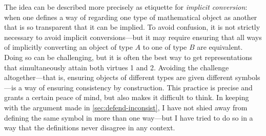 The idea can be described more precisely as etiquette for \emph{implicit conversion}: when one defines a way of regarding one type of mathematical object as another that is so transparent that it can be implied. 
%
To avoid confusion, it is not strictly necessary to avoid implicit conversions---but it may require ensuring that all ways of implicitly converting an object of type $A$ to one of type $B$ are equivalent. 
%
Doing so can be challenging, but it is often the best way to get representations that simultaneously attain both virtues 1 and 2. 
%
%
Avoiding the challenge altogether---that is, ensuring objects of different types are given different symbols---is 
    a way of ensuring consistency by construction. 
This practice is precise and grants a certain peace of mind, but also makes it difficult to think. 
%
In keeping with the argument made in \cref{sec:defend-inconsist}, I have not shied away from defining the same symbol in more than one way---but I have tried to do so in a way that the definitions never disagree in any context. 
%

    

